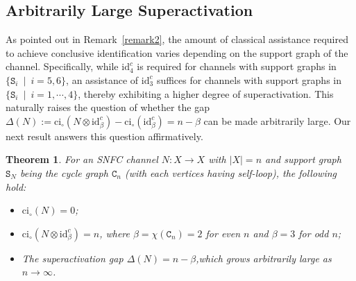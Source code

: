 \documentclass[12pt,a4paper]{article}
\newtheorem{theorem}{Theorem}
\begin{document}
\subsection{Arbitrarily Large Superactivation}
As pointed out in Remark~\ref{remark2}, the amount of classical assistance required to achieve conclusive identification varies depending on the support graph of the channel. Specifically, while $\mathrm{id}^c_4$ is required for channels with support graphs in $\{\mathtt{S}_i~\mid~i=5,6\}$, an assistance of $\mathrm{id}^c_3$ suffices for channels with support graphs in $\{\mathtt{S}_i~\mid~i=1,\cdots,4\}$, thereby exhibiting a higher degree of superactivation. This naturally raises the question of whether the gap $\Delta(N):=  \mathrm{ci}_\circ(N \otimes \mathrm{id}^c_\beta) -  \mathrm{ci}_\circ(\mathrm{id}^c_\beta) = n - \beta$ can be made arbitrarily large. Our next result answers this question affirmatively.  

\begin{theorem}\label{theo2}
For an SNFC channel $N : X \to X$ with $|X| = n$ and support graph $\mathtt{S}_N$ being the cycle graph $\mathtt{C}_n$ (with each vertices having self-loop), the following hold:
\begin{itemize}[itemsep=-0.15cm, parsep=0.15cm, topsep=2pt, leftmargin=0.8cm]
\item[\emph{(i)}] $\mathrm{ci}_\circ(N) = 0$;
\item[\emph{(ii)}] $\mathrm{ci}_\circ(N \otimes \mathrm{id}^c_\beta)=n$, where $\beta = \chi(\mathtt{C}_n)=2$ for even $n$ and $\beta=3$ for odd $n$;
\item[\emph{(iii)}] The superactivation gap $\Delta(N)=n-\beta$,which grows arbitrarily large as $n \to \infty$.
\end{itemize}
\end{theorem}
\end{document}
